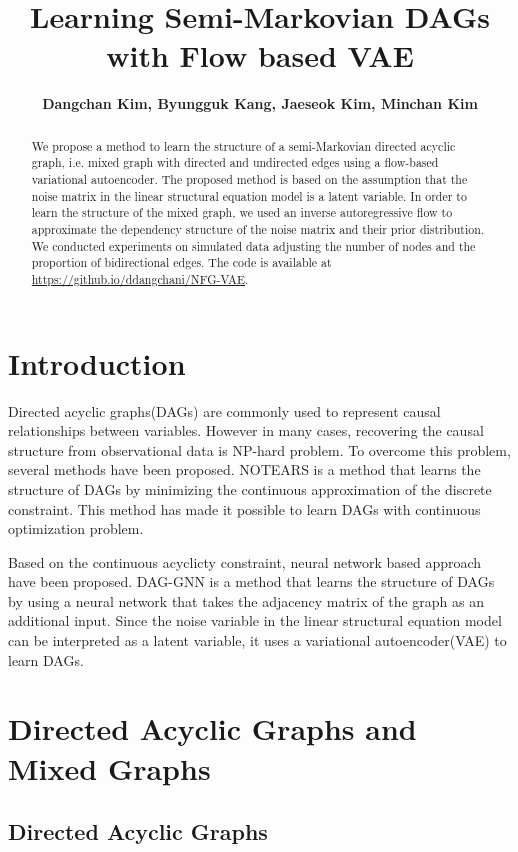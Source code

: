 \documentclass[10pt]{article}
\title{
\textbf{Learning Semi-Markovian DAGs with Flow based VAE}}
\author{\normalsize\bfseries Dangchan Kim, Byungguk Kang, Jaeseok Kim, Minchan Kim}
\begin{document}
\maketitle

\begin{abstract}
    We propose a method to learn the structure of a semi-Markovian directed acyclic graph, i.e. mixed graph with directed and undirected edges using a flow-based variational autoencoder. The proposed method is based on the assumption that the noise matrix in the linear structural equation model is a latent variable. In order to learn the structure of the mixed graph, we used an inverse autoregressive flow to approximate the dependency structure of the noise matrix and their prior distribution. We conducted experiments on simulated data adjusting the number of nodes and the proportion of bidirectional edges. The code is available at \url{https://github.io/ddangchani/NFG-VAE}.
\end{abstract}

\section{Introduction}

Directed acyclic graphs(DAGs) are commonly used to represent causal relationships between variables. However in many cases, recovering the causal structure from observational data is NP-hard problem. \cite{ChickeringNPhard} To overcome this problem, several methods have been proposed. NOTEARS \cite{zheng2018dags} is a method that learns the structure of DAGs by minimizing the continuous approximation of the discrete constraint. This method has made it possible to learn DAGs with continuous optimization problem.

Based on the continuous acyclicty constraint, neural network based approach have been proposed. DAG-GNN \cite{yu2019daggnn} is a method that learns the structure of DAGs by using a neural network that takes the adjacency matrix of the graph as an additional input. Since the noise variable in the linear structural equation model can be interpreted as a latent variable, it uses a variational autoencoder(VAE) to learn DAGs.

\section{Directed Acyclic Graphs and Mixed Graphs}
\subsection{Directed Acyclic Graphs}
\end{document}
